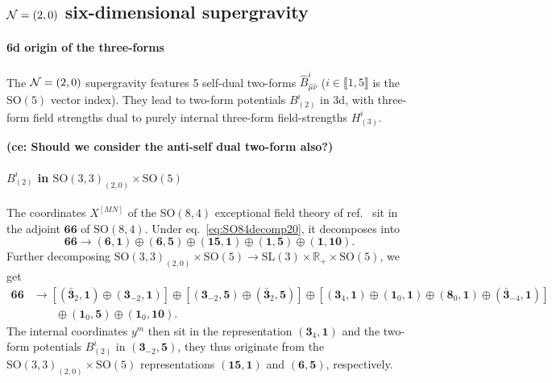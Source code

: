 \documentclass[11pt]{article}
\newcommand{\SO}{\ensuremath{\mathrm{SO}}\xspace}
\newcommand{\SL}{\ensuremath{\mathrm{SL}}\xspace}
\newcommand{\R}{\ensuremath{\mathbb{R}}\xspace}
\newcommand{\ce}[1]{\marginpar{\parbox{\marginparwidth}{\boldmath $\Longleftarrow$}}
{\boldmath\bfseries (ce: #1)}}
\begin{document}
  \subsection{\texorpdfstring{${\cal N}=(2,0)$}{N=(2,0)} six-dimensional supergravity}

  \paragraph{6d origin of the three-forms} The ${\cal N}=(2,0)$ supergravity features 5 self-dual two-forms $\hat{B}_{\hat\mu\hat\nu}^{i}$ ($i\in\llbracket1,5\rrbracket$ is the $\SO(5)$ vector index). They lead to two-form potentials $B_{(2)}^{i}$ in 3d, with three-form field strengths dual to purely internal three-form field-strengths $H_{(3)}^{i}$.

  \ce{Should we consider the anti-self dual two-form also?}

  \paragraph{\boldmath $B_{(2)}^{i}$ in $\SO(3,3)_{(2,0)}\times\SO(5)$}
  The coordinates $X^{[MN]}$ of the $\SO(8,4)$ exceptional field theory of ref.~\cite{Hohm:2017wtr} sit in the adjoint $\bm{66}$ of $\SO(8,4)$. Under eq.~\eqref{eq:SO84decomp20}, it decomposes into
  \begin{equation}  
    \bm{66} \longrightarrow (\bm{6},\bm{1}) \oplus (\bm{6},\bm{5}) \oplus (\bm{15},\bm{1}) \oplus (\bm{1},\bm{5}) \oplus (\bm{1},\bm{10}).
  \end{equation}
  Further decomposing $\SO(3,3)_{(2,0)}\times\SO(5)\rightarrow\SL(3)\times\R_{+}\times\SO(5)$, we get
  \begin{equation}
    \begin{aligned}
      \bm{66} &\longrightarrow [(\bm{\bar{3}}_{2},\bm{1})\oplus(\bm{3}_{-2},\bm{1})] \oplus [(\bm{3}_{-2},\bm{5})\oplus(\bm{\bar{3}}_{2},\bm{5})] \oplus [(\bm{3}_{4},\bm{1})\oplus(\bm{1}_{0},\bm{1})\oplus(\bm{8}_{0},\bm{1})\oplus(\bm{\bar{3}}_{-4},\bm{1})] \\
      & \qquad \oplus (\bm{1}_{0},\bm{5}) \oplus (\bm{1}_{0},\bm{10}).
    \end{aligned}
  \end{equation}
  The internal coordinates $y^{m}$ then sit in the representation $(\bm{3}_{4},\bm{1})$ and the two-form potentials $B_{(2)}^{i}$ in $(\bm{3}_{-2},\bm{5})$, they thus originate from the $\SO(3,3)_{(2,0)}\times\SO(5)$ representations $(\bm{15},\bm{1})$ and $(\bm{6},\bm{5})$, respectively.
\end{document}
